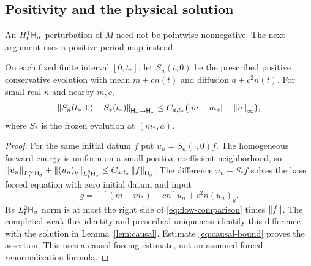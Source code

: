 \subsection{Positivity and the physical solution}

An $H^1_t\mathsf H_\sigma$ perturbation of $M$ need not be pointwise
nonnegative. The next argument uses a positive period map instead.

\begin{lemma}\label{lem:flow-comparison}
On each fixed finite interval $[0,t_*]$, let $S_n(t,0)$ be the
prescribed positive conservative evolution with mean $m+cn(t)$
and diffusion $a+c^2n(t)$. For small real $n$ and nearby $m,c$,
\begin{equation}\label{eq:flow-comparison}
 \left\|S_n(t_*,0)-S_*(t_*)\right\|_{\mathsf H_\sigma\to\mathsf H_\sigma}
 \le C_{a,t_*}\bigl(|m-m_*|+\left\|n\right\|_\infty\bigr),
\end{equation}
where $S_*$ is the frozen evolution at $(m_*,a)$.
\end{lemma}

\begin{proof}
For the same initial datum $f$ put $u_n=S_n(\cdot,0)f$.
The homogeneous forward energy is uniform on a small positive
coefficient neighborhood, so
$\left\|u_n\right\|_{L^\infty_t\mathsf H_\sigma}
 +\left\|(u_n)_y\right\|_{L^2_t\mathsf H_\sigma}\le C_{a,t_*}\left\|f\right\|_{\mathsf H_\sigma}$.
The difference $u_n-S_*f$ solves the base forced equation with
zero initial datum and input
\[
 g=-[(m-m_*)+cn]u_n+c^2n(u_n)_y .
\]
Its $L^2_t\mathsf H_\sigma$ norm is at most the right side of
\eqref{eq:flow-comparison} times $\left\|f\right\|$. The completed weak
flux identity and prescribed uniqueness identify this difference
with the solution in Lemma~\ref{lem:causal}. Estimate
\eqref{eq:causal-bound} proves the assertion. This uses a causal
forcing estimate, not an assumed forced renormalization formula.
\end{proof}

